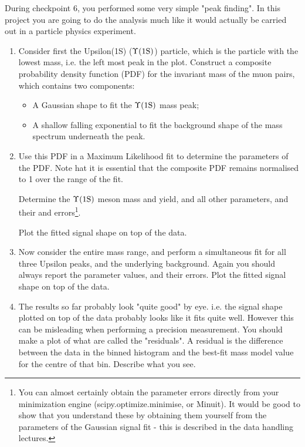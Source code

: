 During checkpoint 6, you performed some very simple "peak finding". In this project you are going to do the analysis much like it would actually be carried out in a particle physics experiment.

\begin{enumerate}
\item Consider first the Upsilon(1S) ($\Upsilon \rm (1S)$) particle, which is the particle with the lowest mass, i.e. the left most  peak in the plot. Construct a composite probability density function (PDF) for the invariant mass of the muon pairs, which contains two components:
\begin{itemize}
\item A Gaussian shape to fit the  $\Upsilon \rm (1S)$ mass peak;
\item A shallow falling exponential to fit the background shape of the mass spectrum underneath the peak.
\end{itemize}

\item	Use this PDF in a Maximum Likelihood fit to determine the parameters of the PDF. Note hat it is essential that the composite PDF remains normalised to 1 over the range of the fit.

Determine the $\Upsilon \rm (1S)$  meson mass and yield, and all other parameters, and their and errors\footnote{You can almost certainly obtain the parameter errors directly from your minimization engine (scipy.optimize.minimise, or Minuit). It would be good to show that you understand these by obtaining them yourself from the parameters of the Gaussian signal fit - this is described in the data handling lectures.}.

Plot the fitted signal shape on top of the data.

\item Now consider the entire mass range, and perform a simultaneous fit for all three Upsilon peaks, and the underlying background. Again you should always report the parameter values, and their errors. Plot the fitted signal shape on top of the data.

\item The results so far probably look "quite good" by eye.  i.e. the signal shape plotted on top of the data probably looks like it fits quite well.  However this can be misleading when performing a precision measurement.  You should make a plot of what are called the "residuals". A residual is the difference between the data in the binned histogram and the best-fit mass model value for the centre of that bin. Describe what you see.


\end{enumerate}
